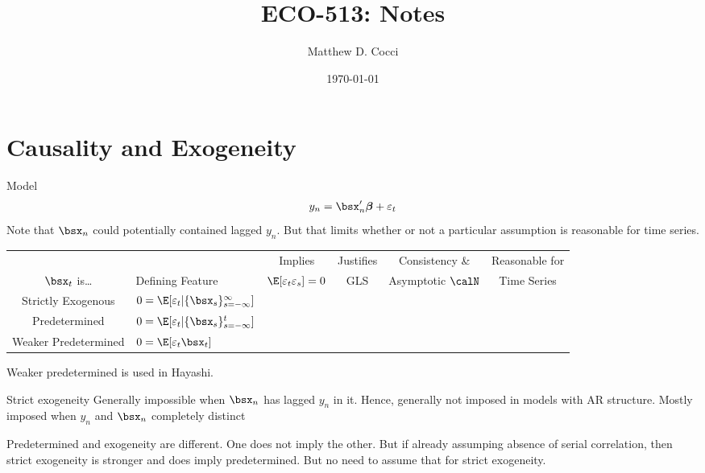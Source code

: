 \documentclass[12pt]{article}
\author{Matthew D. Cocci}
\title{ECO-513: Notes}
\date{\today}
\theoremstyle{plain}
\theoremstyle{definition}
\theoremstyle{remark}
\newcommand{\bsbeta}{\boldsymbol{\beta}}
\newcommand{\cmark}{\text{\ding{51}}}
\newcommand{\xmark}{\text{\ding{55}}}
\begin{document}
\maketitle

\tableofcontents


\clearpage
\section{Causality and Exogeneity}

Model
\begin{align*}
  y_n
  = \bsx_n'\bsbeta + \varepsilon_t
\end{align*}
Note that $\bsx_n$ could potentially contained lagged $y_n$. But that
limits whether or not a particular assumption is reasonable for time
series.
\begin{table}[htbp!]
\centering
\begin{tabular}{c|lcccc}
    &
    & Implies
    & Justifies
    & Consistency \&
    & Reasonable for
  \\
  $\bsx_t$ is\dots
    & Defining Feature
    & $\E[\varepsilon_t\varepsilon_{s}]=0$
    & GLS
    & Asymptotic $\calN$
    & Time Series
  \\\hline\hline
  Strictly Exogenous
    & $0=\E[\varepsilon_t|\{\bsx_s\}_{s=-\infty}^\infty]$
    & \xmark
    & \cmark
    & \cmark
    & \xmark
  \\
  Predetermined
    & $0=\E[\varepsilon_t|\{\bsx_s\}_{s=-\infty}^t]$
    & \cmark
    & \xmark
    & \cmark
    & \cmark
  \\
  Weaker Predetermined
    & $0=\E[\varepsilon_t\bsx_t]$
    & \xmark
    & \xmark
    & \cmark
    & \cmark
\end{tabular}
\end{table}

Weaker predetermined is used in Hayashi.

Strict exogeneity Generally impossible when $\bsx_n$ has lagged $y_n$ in
it.  Hence, generally not imposed in models with AR structure.
Mostly imposed when $y_n$ and $\bsx_n$ completely distinct

Predetermined and exogeneity are different. One does not imply the
other.
But if already assumping absence of serial correlation, then strict
exogeneity is stronger and does imply predetermined.
But no need to assume that for strict exogeneity.
\end{document}
